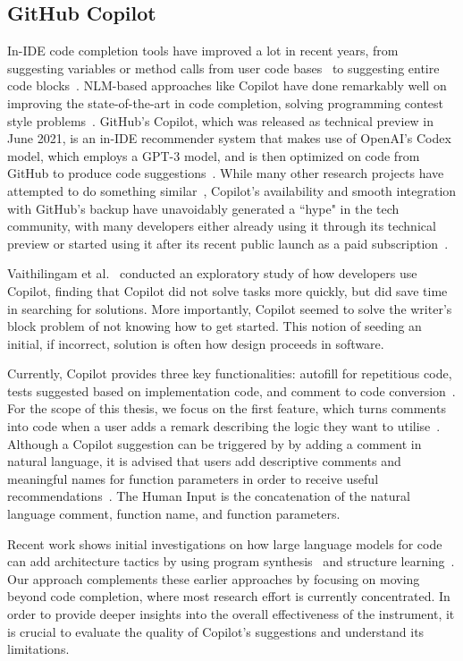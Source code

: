 \subsection{GitHub Copilot}
In-IDE code completion tools have improved a lot in recent years, from suggesting variables or method calls from user code bases~\cite{mandelin2005} to suggesting entire code blocks~\cite{Ciniselli2021}. 
NLM-based approaches like Copilot have done remarkably well on improving the state-of-the-art in code completion, solving programming contest style problems~\cite{empirical_eval}.
GitHub's Copilot, which was released as technical preview in June 2021, is an in-IDE recommender system that makes use of OpenAI's Codex model, which employs a GPT-3 model, and is then optimized on code from GitHub to produce code suggestions~\cite{Copilot-web}. 
While many other research projects have attempted to do something similar~\cite{codesearch, natural, coacor}, Copilot's availability and smooth integration with GitHub's backup have unavoidably generated a ``hype" in the tech community, with many developers either already using it through its technical preview or started using it after its recent public launch as a paid subscription~\cite{Copilot-web}. 

Vaithilingam et al.~\cite{Vaithilingam2022} conducted an exploratory study of how developers use Copilot, finding that Copilot did not solve tasks more quickly, but did save time in searching for solutions. More importantly, Copilot seemed to solve the writer's block problem of not knowing how to get started. This notion of seeding an initial, if incorrect, solution is often how design proceeds in software. 

Currently, Copilot provides three key functionalities: autofill for repetitious code, tests suggested based on implementation code, and comment to code conversion~\cite{Copilot-web}. For the scope of this thesis, we focus on the first feature, which turns comments into code when a user adds a remark describing the logic they want to utilise~\cite{Copilot-web}. Although a Copilot suggestion can be triggered by by adding a comment in natural language, it is advised that users add descriptive comments and meaningful names for function parameters in order to receive useful recommendations~\cite{Copilot-web}. The Human Input is the concatenation of the natural language comment, function name, and function parameters.

Recent work shows initial investigations on how large language models for code can add architecture tactics by using program synthesis~\cite{Shokri2021} and structure learning~\cite{Karmakar2021}.
Our approach complements these earlier approaches by focusing on moving beyond code completion, where most research effort is currently concentrated.
In order to provide deeper insights into the overall effectiveness of the instrument, it is crucial to evaluate the quality of Copilot's suggestions and understand its limitations.

